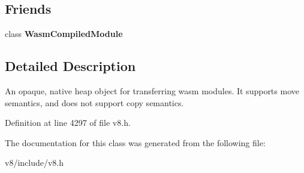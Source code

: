 \subsection*{Friends}
\begin{DoxyCompactItemize}
\item 
\mbox{\label{classv8_1_1WasmCompiledModule_1_1TransferrableModule_aa06dc5f793f5043ce27d45b99ea43fa9}} 
class {\bfseries Wasm\+Compiled\+Module}
\end{DoxyCompactItemize}


\subsection{Detailed Description}
An opaque, native heap object for transferring wasm modules. It supports move semantics, and does not support copy semantics. 

Definition at line 4297 of file v8.\+h.



The documentation for this class was generated from the following file\+:\begin{DoxyCompactItemize}
\item 
v8/include/v8.\+h\end{DoxyCompactItemize}

